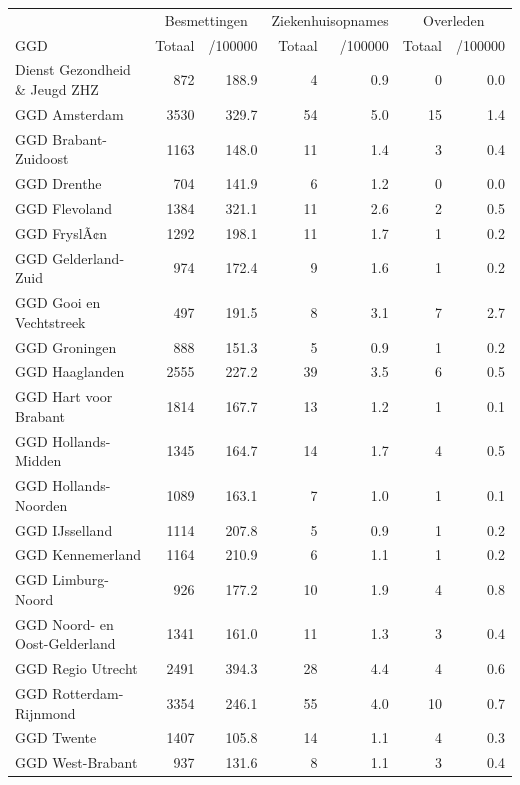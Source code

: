 \documentclass[
  english,
  man,floatsintext]{apa6}
\begin{document}
\begin{table}
\centering\begingroup\fontsize{10}{12}\selectfont

\begin{threeparttable}
\begin{tabular}{lrrrrrr}
\toprule
\multicolumn{1}{c}{ } & \multicolumn{2}{c}{Besmettingen} & \multicolumn{2}{c}{Ziekenhuisopnames} & \multicolumn{2}{c}{Overleden} \\
\cmidrule(l{3pt}r{3pt}){2-3} \cmidrule(l{3pt}r{3pt}){4-5} \cmidrule(l{3pt}r{3pt}){6-7}
GGD & Totaal & /100000 & Totaal & /100000 & Totaal & /100000\\
\midrule
Dienst Gezondheid \& Jeugd ZHZ & 872 & 188.9 & 4 & 0.9 & 0 & 0.0\\
GGD Amsterdam & 3530 & 329.7 & 54 & 5.0 & 15 & 1.4\\
GGD Brabant-Zuidoost & 1163 & 148.0 & 11 & 1.4 & 3 & 0.4\\
GGD Drenthe & 704 & 141.9 & 6 & 1.2 & 0 & 0.0\\
GGD Flevoland & 1384 & 321.1 & 11 & 2.6 & 2 & 0.5\\
GGD FryslÃ¢n & 1292 & 198.1 & 11 & 1.7 & 1 & 0.2\\
GGD Gelderland-Zuid & 974 & 172.4 & 9 & 1.6 & 1 & 0.2\\
GGD Gooi en Vechtstreek & 497 & 191.5 & 8 & 3.1 & 7 & 2.7\\
GGD Groningen & 888 & 151.3 & 5 & 0.9 & 1 & 0.2\\
GGD Haaglanden & 2555 & 227.2 & 39 & 3.5 & 6 & 0.5\\
GGD Hart voor Brabant & 1814 & 167.7 & 13 & 1.2 & 1 & 0.1\\
GGD Hollands-Midden & 1345 & 164.7 & 14 & 1.7 & 4 & 0.5\\
GGD Hollands-Noorden & 1089 & 163.1 & 7 & 1.0 & 1 & 0.1\\
GGD IJsselland & 1114 & 207.8 & 5 & 0.9 & 1 & 0.2\\
GGD Kennemerland & 1164 & 210.9 & 6 & 1.1 & 1 & 0.2\\
GGD Limburg-Noord & 926 & 177.2 & 10 & 1.9 & 4 & 0.8\\
GGD Noord- en Oost-Gelderland & 1341 & 161.0 & 11 & 1.3 & 3 & 0.4\\
GGD Regio Utrecht & 2491 & 394.3 & 28 & 4.4 & 4 & 0.6\\
GGD Rotterdam-Rijnmond & 3354 & 246.1 & 55 & 4.0 & 10 & 0.7\\
GGD Twente & 1407 & 105.8 & 14 & 1.1 & 4 & 0.3\\
GGD West-Brabant & 937 & 131.6 & 8 & 1.1 & 3 & 0.4\\

\end{tabular}
\end{threeparttable}
\end{table}
\end{document}
